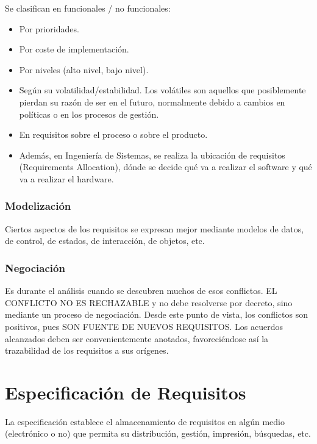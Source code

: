 Se clasifican en funcionales / no funcionales:
\begin{itemize}[noitemsep]
\item Por prioridades.
\item Por coste de implementación.
\item Por niveles (alto nivel, bajo nivel).
\item Según su volatilidad/estabilidad. Los volátiles son aquellos que
  posiblemente pierdan su razón de ser en el futuro, normalmente
  debido a cambios en políticas o en los procesos de gestión.
\item En requisitos sobre el proceso o sobre el producto.
\item Además, en Ingeniería de Sistemas, se realiza la ubicación de
  requisitos (Requirements Allocation), dónde se decide qué va a
  realizar el software y qué va a realizar el hardware.
\end{itemize}

\subsubsection{Modelización}
\label{sec:requisitos:analisis:modelizacion}

Ciertos aspectos de los requisitos se expresan mejor mediante modelos
de datos, de control, de estados, de interacción, de objetos, etc.

\subsubsection{Negociación}
\label{sec:requisitos:analisis:negociacion}

Es durante el análisis cuando se descubren muchos de esos
conflictos. EL CONFLICTO NO ES RECHAZABLE y no debe resolverse por
decreto, sino mediante un proceso de negociación. Desde este punto de
vista, los conflictos son positivos, pues SON FUENTE DE NUEVOS
REQUISITOS. Los acuerdos alcanzados deben ser convenientemente
anotados, favoreciéndose así la trazabilidad de los requisitos a sus
orígenes.

\section{Especificación de Requisitos}
\label{sec:requisitos:especificacion}

La especificación establece el almacenamiento de requisitos en algún
medio (electrónico o no) que permita su distribución, gestión,
impresión, búsquedas, etc.


